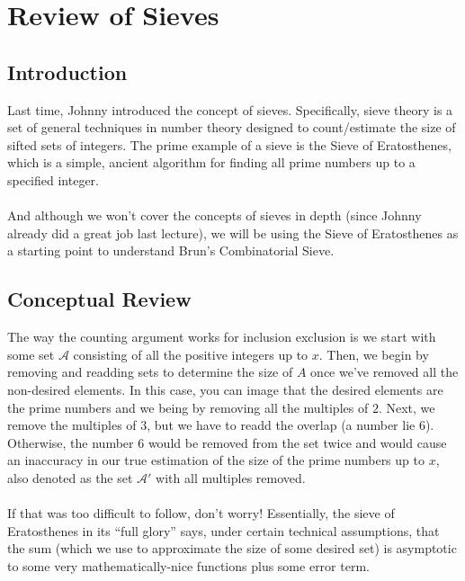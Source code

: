 

\pagebreak
\section{Review of Sieves}
\subsection{Introduction}
Last time, Johnny introduced the concept of sieves. Specifically, sieve theory is a set of general techniques in number theory designed to count/estimate the size of sifted sets of integers.
The prime example of a sieve is the Sieve of Eratosthenes, which is a simple, ancient algorithm for finding all prime numbers up to a specified integer.\\
\\
And although we won't cover the concepts of sieves in depth (since Johnny already did a great job last lecture), we will be using the Sieve of Eratosthenes as a starting point to understand Brun's Combinatorial Sieve.
\subsection{Conceptual Review}
The way the counting argument works for inclusion exclusion is we start with some set $\mathcal{A}$ consisting of all the positive integers up to $x$. Then, we begin by removing and readding sets to determine the size of $A$ once we've removed all the non-desired elements. In this case, you can image that the desired elements are the prime numbers and we being by removing all the multiples of $2$. Next, we remove the multiples of $3$, but we have to readd the overlap (a number lie $6$). Otherwise, the number $6$ would be removed from the set twice and would cause an inaccuracy in our true estimation of the size of the prime numbers up to $x$, also denoted as the set $\mathcal{A}'$ with all multiples removed.\\
\\
If that was too difficult to follow, don't worry! Essentially, the sieve of Eratosthenes in its ``full glory'' says, under certain technical assumptions, that the sum (which we use to approximate the size of some desired set) is asymptotic to some very mathematically-nice functions plus some error term.
